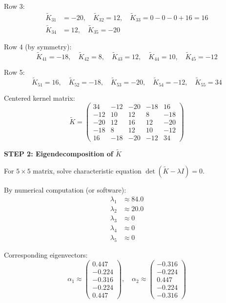 \documentclass[12pt]{article}
\begin{document}
\begin{solution}
Row 3:
\begin{align*}
\tilde{K}_{31} &= -20, \quad \tilde{K}_{32} = 12, \quad \tilde{K}_{33} = 0 - 0 - 0 + 16 = 16 \\
\tilde{K}_{34} &= 12, \quad \tilde{K}_{35} = -20
\end{align*}

Row 4 (by symmetry):
\[
\tilde{K}_{41} = -18, \quad \tilde{K}_{42} = 8, \quad \tilde{K}_{43} = 12, \quad \tilde{K}_{44} = 10, \quad \tilde{K}_{45} = -12
\]

Row 5:
\[
\tilde{K}_{51} = 16, \quad \tilde{K}_{52} = -18, \quad \tilde{K}_{53} = -20, \quad \tilde{K}_{54} = -12, \quad \tilde{K}_{55} = 34
\]

Centered kernel matrix:
\[
\tilde{K} = \begin{pmatrix}
34 & -12 & -20 & -18 & 16 \\
-12 & 10 & 12 & 8 & -18 \\
-20 & 12 & 16 & 12 & -20 \\
-18 & 8 & 12 & 10 & -12 \\
16 & -18 & -20 & -12 & 34
\end{pmatrix}
\]

\textbf{STEP 2: Eigendecomposition of $\tilde{K}$}

For $5 \times 5$ matrix, solve characteristic equation $\det(\tilde{K} - \lambda I) = 0$.

By numerical computation (or software):
\begin{align*}
\lambda_1 &\approx 84.0 \\
\lambda_2 &\approx 20.0 \\
\lambda_3 &\approx 0 \\
\lambda_4 &\approx 0 \\
\lambda_5 &\approx 0
\end{align*}

Corresponding eigenvectors:
\[
\alpha_1 \approx \begin{pmatrix} 0.447 \\ -0.224 \\ -0.316 \\ -0.224 \\ 0.447 \end{pmatrix}, \quad
\alpha_2 \approx \begin{pmatrix} -0.316 \\ -0.224 \\ 0.447 \\ -0.224 \\ -0.316 \end{pmatrix}
\]


\end{solution}
\end{document}
